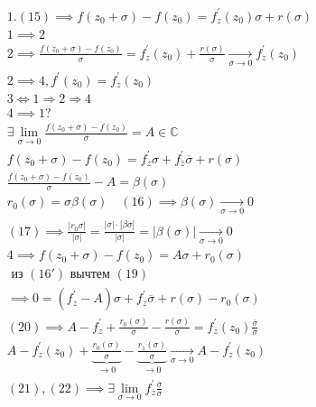 \documentclass[main]{subfiles}
\begin{document}
\begin{longProof}
    \begin{gather*}
        1. (15) \implies f(z_0 + \sigma) - f(z_0) = f^\prime_z(z_0) \sigma + r(\sigma) \\
         1 \implies 2  \\
         2 \implies \frac{f(z_0 + \sigma)-f(z_0)}{\sigma} = f^\prime_z(z_0) + \frac{r(\sigma)}{\sigma} \underset{\sigma \to 0}{ \longrightarrow} f^\prime_z(z_0) \\
        2 \implies 4, f^\prime(z_0) = f^\prime_z(z_0) \\
        3 \Leftrightarrow 1 \Rightarrow 2 \Rightarrow 4 \\
        4 \implies 1 ? \\
        \exists \underset{\sigma \to 0}{\lim} \frac{f(z_0 + \sigma) - f(z_0)}{\sigma} = A \in \mathbb{C} \tag{16} \\
        f(z_0 + \sigma) - f(z_0) = f^\prime_z \sigma + f^\prime_{\overline{z}} \overline{\sigma} + r(\sigma) \tag{16\prime}\\
        \frac{f(z_0 + \sigma) - f(z_0)}{\sigma} - A = \beta(\sigma) \\
        r_0(\sigma) = \sigma \beta(\sigma) \quad (16) \implies \beta(\sigma) \underset{\sigma \to 0}{\longrightarrow} 0 \tag{17}\\
        (17) \implies \frac{|r_0\sigma|}{|\sigma|} = \frac{|\sigma| \cdot |\beta{\sigma}|}{|\sigma|} = |\beta(\sigma)| \underset{\sigma \to 0}{\longrightarrow} 0 \tag{18}\\
        4 \implies f(z_0 + \sigma) - f(z_0) = A\sigma + r_0(\sigma) \tag{19}\\
        \text{ из } (16\prime) \text{ вычтем } (19)  \\
         \implies 0 = (f^\prime_z - A) \sigma  + f^\prime_z \overline{\sigma } + r(\sigma) - r_0(\sigma)\tag{20} \\
        (20) \implies A - f^\prime_z + \frac{r_0(\sigma)}{\sigma} - \frac{r(\sigma)}{\sigma} = f^\prime_{\overline{z}}(z_0) \frac{\overline{\sigma}}{\sigma} \tag{21} \\
        A - f^\prime_z(z_0) + \underbrace{\frac{r_0(\sigma)}{\sigma}}_{\to 0} - \underbrace{\frac{r_1(\sigma)}{\sigma}}_{\to 0} \underset{\sigma \to 0}{\longrightarrow} A - f^\prime_z(z_0) \tag{22}\\
        (21), (22) \implies \exists \underset{\sigma \to 0}{\lim} f^\prime_{\overline{z{}}} \frac{\overline{\sigma}}{\sigma} \tag{23} \\
    \end{gather*}

\end{longProof}
\end{document}
